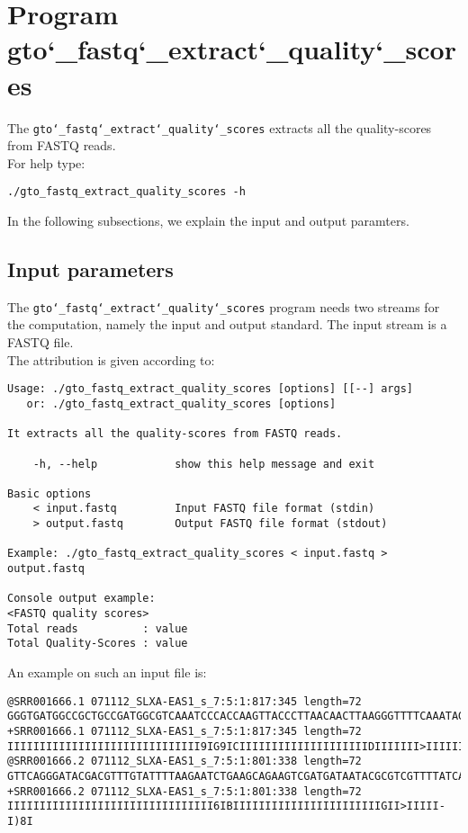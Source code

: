 \section{Program gto\char`_fastq\char`_extract\char`_quality\char`_scores}
The \texttt{gto\char`_fastq\char`_extract\char`_quality\char`_scores} extracts all the quality-scores from FASTQ reads.\\
For help type:
\begin{lstlisting}
./gto_fastq_extract_quality_scores -h
\end{lstlisting}
In the following subsections, we explain the input and output paramters.

\subsection*{Input parameters}

The \texttt{gto\char`_fastq\char`_extract\char`_quality\char`_scores} program needs two streams for the computation, namely the input and output standard. The input stream is a FASTQ file.\\
The attribution is given according to:
\begin{lstlisting}
Usage: ./gto_fastq_extract_quality_scores [options] [[--] args]
   or: ./gto_fastq_extract_quality_scores [options]

It extracts all the quality-scores from FASTQ reads.

    -h, --help            show this help message and exit

Basic options
    < input.fastq         Input FASTQ file format (stdin)
    > output.fastq        Output FASTQ file format (stdout)

Example: ./gto_fastq_extract_quality_scores < input.fastq > output.fastq

Console output example:
<FASTQ quality scores>
Total reads          : value
Total Quality-Scores : value
\end{lstlisting}
An example on such an input file is:
\begin{lstlisting}
@SRR001666.1 071112_SLXA-EAS1_s_7:5:1:817:345 length=72
GGGTGATGGCCGCTGCCGATGGCGTCAAATCCCACCAAGTTACCCTTAACAACTTAAGGGTTTTCAAATAGA
+SRR001666.1 071112_SLXA-EAS1_s_7:5:1:817:345 length=72
IIIIIIIIIIIIIIIIIIIIIIIIIIIIII9IG9ICIIIIIIIIIIIIIIIIIIIIDIIIIIII>IIIIII/
@SRR001666.2 071112_SLXA-EAS1_s_7:5:1:801:338 length=72
GTTCAGGGATACGACGTTTGTATTTTAAGAATCTGAAGCAGAAGTCGATGATAATACGCGTCGTTTTATCAT
+SRR001666.2 071112_SLXA-EAS1_s_7:5:1:801:338 length=72
IIIIIIIIIIIIIIIIIIIIIIIIIIIIIIII6IBIIIIIIIIIIIIIIIIIIIIIIIGII>IIIII-I)8I
\end{lstlisting}

